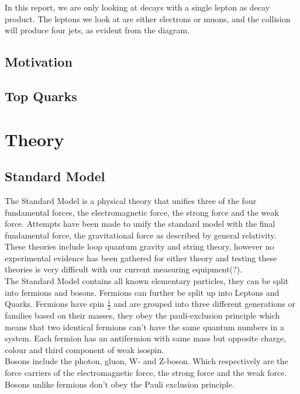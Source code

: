 \documentclass[11pt,a4paper]{article}
\begin{document}
In this report, we are only looking at decays with a single lepton as decay
product. The leptons we look at are either electrons or muons, and the collision
will produce four jets, as evident from the diagram.


\subsection{Motivation}

\subsection{Top Quarks}

\section{Theory}

\subsection{Standard Model}
The Standard Model is a physical theory that unifies
three of the four fundamental forces, the electromagnetic force, the strong
force and the weak force. Attempts have been made to unify the standard model
with the final fundamental force, the gravitational force as described by
general relativity. These theories include loop quantum gravity and string
theory, however no experimental evidence has been gathered for either theory and
testing these theories is very difficult with our current measuring
equipment(?).\\

The Standard Model contains all known elementary particles, they can be split
into fermions and bosons. Fermions can further be split up into Leptons and
Quarks. Fermions have spin $\frac{1}{2}$ and are grouped into three different
generations or families based on their masses, they obey the pauli-exclusion
principle which means that two identical fermions can't have the same quantum
numbers in a system. Each fermion has an antifermion with same mass but opposite
charge, colour and third component of weak isospin. \\

Bosons include the photon, gluon, W- and Z-boson. Which respectively are the
force carriers of the electromagnetic force, the strong force and the weak
force. Bosons unlike fermions don't obey the Pauli exclusion principle.
\end{document}
